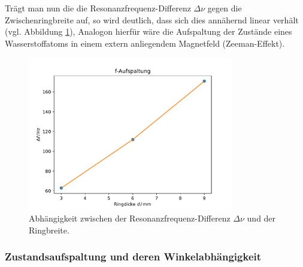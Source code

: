 Trägt man nun die die Resonanzfrequenz-Differenz $\Delta\nu$ gegen die Zwischenringbreite auf,
so wird deutlich, dass sich dies annähernd linear verhält (vgl. Abbildung \ref{fig:d_res}),
Analogon hierfür wäre die Aufspaltung der Zustände eines Wasserstoffatoms in einem extern anliegendem Magnetfeld (Zeeman-Effekt).

\begin{figure}[H]
    \center
    \includegraphics[width=0.8\textwidth]{plots/Hatom/faufspaltung.pdf}
    \caption{Abhängigkeit zwischen der Resonanzfrequenz-Differenz $\Delta\nu$ und der Ringbreite.}
    \label{fig:d_res}
\end{figure}
\newpage
\subsubsection*{Zustandsaufspaltung und deren Winkelabhängigkeit}



